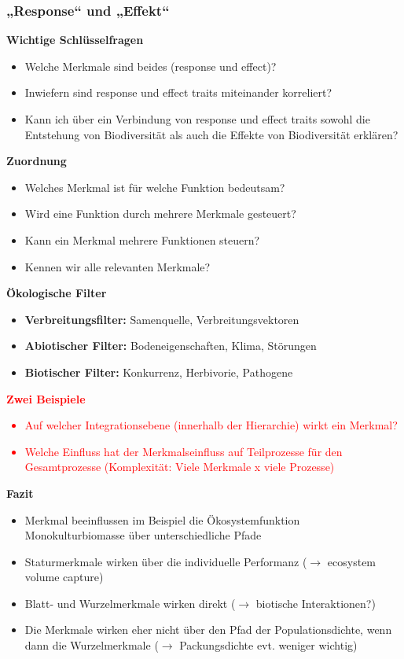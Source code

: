 \newpage
\subsubsection{„Response“ und „Effekt“}
\textbf{Wichtige Schlüsselfragen}
\begin{itemize}
	\item Welche Merkmale sind beides (response und effect)?
	\item Inwiefern sind response und effect traits miteinander korreliert?
	\item Kann ich über ein Verbindung von response und effect traits sowohl die Entstehung von Biodiversität als auch die Effekte von Biodiversität erklären?
\end{itemize}

\textbf{Zuordnung}
\begin{itemize}
	\item Welches Merkmal ist für welche Funktion bedeutsam?
	\item Wird eine Funktion durch mehrere Merkmale gesteuert?
	\item Kann ein Merkmal mehrere Funktionen steuern?
	\item Kennen wir alle relevanten Merkmale?
\end{itemize}

\textbf{Ökologische Filter}
\begin{itemize}
	\item \textbf{Verbreitungsfilter:} Samenquelle, Verbreitungsvektoren
	\item \textbf{Abiotischer Filter:} Bodeneigenschaften, Klima, Störungen
	\item \textbf{Biotischer Filter:} Konkurrenz, Herbivorie, Pathogene
\end{itemize}

\textcolor{red}{\textbf{Zwei Beispiele}
\begin{itemize}
	\item Auf welcher Integrationsebene (innerhalb der Hierarchie) wirkt ein Merkmal?
	\item Welche Einfluss hat der Merkmalseinfluss auf Teilprozesse für den Gesamtprozesse (Komplexität: Viele Merkmale x viele Prozesse)
\end{itemize}}

\textbf{Fazit}
\begin{itemize}
	\item Merkmal beeinflussen im Beispiel die Ökosystemfunktion Monokulturbiomasse über unterschiedliche Pfade
	\item Staturmerkmale wirken über die individuelle Performanz ($\rightarrow$ ecosystem volume capture)
	\item Blatt- und Wurzelmerkmale wirken direkt ($\rightarrow$ biotische Interaktionen?)
	\item Die Merkmale wirken eher nicht über den Pfad der Populationsdichte, wenn dann die Wurzelmerkmale ($\rightarrow$ Packungsdichte evt. weniger wichtig)
\end{itemize}
